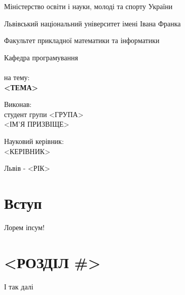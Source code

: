 \documentclass[12pt,a4paper]{article}
\begin{document}

\thispagestyle{empty}
\setlength{\parindent}{1.5cm}
\fontsize{14pt}{6mm}\selectfont

\begin{center}
  Міністерство освіти і науки, молоді та спорту України
  
  Львівський національний університет імені Івана Франка

  Факультет прикладної математики та інформатики

  Кафедра програмування\\[5cm]

  {\bfseries{}}\\[0.5cm]
  на тему:\\[0.5cm]
  {\bfseries\Large <ТЕМА>}\\[5cm]

  \begin{flushleft}
    Виконав:\\
    студент групи <ГРУПА>\\
    <ІМ'Я ПРИЗВІЩЕ>\linebreak

    Науковий керівник:\\
    <КЕРІВНИК>
    
  \end{flushleft}

  \vspace{2cm}
  Львів - <РІК> 
\end{center}

\clearpage

\fontsize{14pt}{6mm}\selectfont

\newcommand{\vect}[1]{(#1_1,#1_2,\dots,#1_n)}

\tableofcontents
\clearpage
{}

\section{Вступ}

Лорем іпсум!

\clearpage

\section{<РОЗДІЛ \#>}

І так далі
\end{document}
